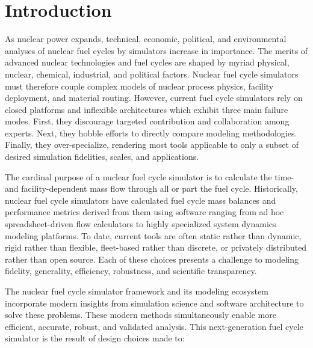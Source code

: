 
\section{Introduction}



As nuclear power expands, technical, economic, political, and environmental
analyses of nuclear fuel cycles by simulators increase in importance. The
merits of advanced nuclear technologies and fuel cycles are
shaped by myriad physical, nuclear, chemical, industrial, and political
factors. Nuclear fuel cycle simulators must therefore couple complex models of
nuclear process physics, facility deployment, and material routing. However,
current fuel cycle simulators rely on closed platforms and inflexible
architectures which exhibit three main failure modes. First, they discourage
targeted contribution and collaboration among experts. Next, they hobble
efforts to directly compare modeling methodologies. Finally, they
over-specialize, rendering most tools applicable to only a subset of desired
simulation fidelities, scales, and applications.

The cardinal purpose of a nuclear fuel cycle simulator is to calculate the
time- and facility-dependent mass flow through all or part the fuel cycle.
Historically, nuclear fuel cycle simulators have calculated fuel cycle mass
balances and performance metrics derived from them using software ranging from
ad hoc spreadsheet-driven flow calculators to highly specialized system
dynamics modeling platforms. To date, current tools are often static rather
than dynamic, rigid rather than flexible, fleet-based rather than discrete, or
privately distributed rather than open source. Each of these choices presents a
challenge to modeling fidelity, generality, efficiency, robustness, and
scientific transparency.

The \Cyclus nuclear fuel cycle simulator framework and its modeling ecosystem
incorporate modern insights from simulation science and software architecture
to solve these problems.  These modern methods simultaneously enable more
efficient, accurate, robust, and validated analysis.  This next-generation fuel
cycle simulator is the result of design choices made to:

